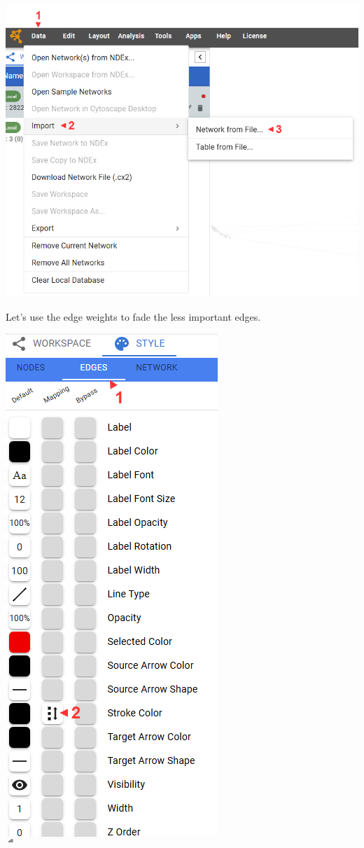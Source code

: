 \documentclass[
]{book}
\begin{document}
\includegraphics{img/lab4/cytoscape_load.png}

Let's use the edge weights to fade the less important edges.

\includegraphics{img/lab4/cytoscape_edge1.png}
\end{document}
